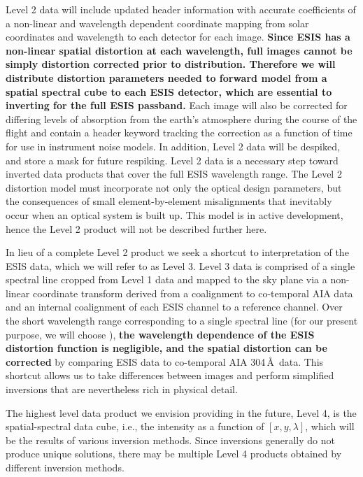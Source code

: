 Level 2 data will include updated header information with accurate coefficients of a non-linear and wavelength dependent coordinate mapping from solar coordinates and wavelength to each detector for each image.
\textbf{Since ESIS has a non-linear spatial distortion at each wavelength, full images cannot be simply distortion corrected prior to distribution.
Therefore we will distribute distortion parameters needed to forward model from a spatial spectral cube to each ESIS detector, which are essential to inverting for the full ESIS passband. }
Each image will also be corrected for differing levels of absorption from the earth's atmosphere during the course of the flight and contain a header keyword tracking the correction as a function of time for use in instrument noise models.
In addition, Level 2 data will be despiked, and store a mask for future respiking.
Level 2 data is a necessary step toward inverted data products that cover the full ESIS wavelength range. 
The Level 2 distortion model must incorporate not only the optical design parameters, but the consequences of small element-by-element misalignments that inevitably occur when an optical system is built up.  
This model is in active development, hence the Level 2 product will not be described further here.


In lieu of a complete Level 2 product we seek a shortcut to interpretation of the ESIS data, which  we will refer to as Level 3.
Level 3 data is comprised of a single spectral line cropped from Level 1 data and mapped to the sky plane via a non-linear coordinate transform derived from a coalignment to co-temporal AIA data and an internal coalignment of each ESIS channel to a reference channel. 
Over the short wavelength range corresponding to a single spectral line (for our present purpose, we will choose \ov), \textbf{the wavelength dependence of the ESIS distortion function is negligible, and the spatial distortion can be corrected} by comparing ESIS data to co-temporal AIA 304\,\AA\ data. 
This shortcut allows us to take differences between images and perform simplified inversions that are nevertheless rich in physical detail.

The highest level data product we envision providing in the future, Level 4, is the spatial-spectral data cube, i.e., the intensity as a function of $[x, y , \lambda]$, which will be the results of various inversion methods.    
Since inversions generally do not produce unique solutions, there may be multiple Level 4 products obtained by different inversion methods.
   


